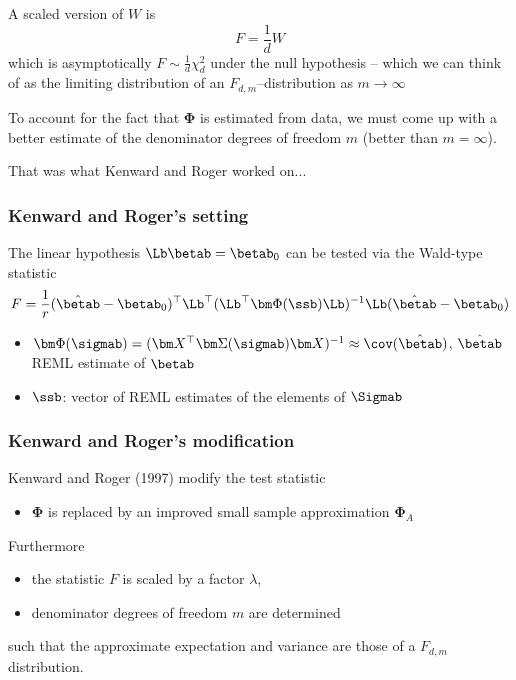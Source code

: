 \begin{sframe}
  A scaled version of $W$ is 
\begin{displaymath}
  F = \frac{1}{d} W
\end{displaymath}
which is asymptotically $F \sim \frac{1}{d} \chi^2_d$
under the null hypothesis -- which we can think of as the limiting distribution
of an $F_{d,m}$--distribution as $m\rightarrow \infty$

To account for the fact that $\bm\Phi$
is estimated from data, we must come up with a better estimate of the
denominator degrees of freedom $m$ (better than $m=\infty$).

That was what Kenward and Roger worked on... 
\end{sframe}

\begin{sframe}
  \frametitle{Kenward and Roger's setting}
The linear hypothesis $\Lb \betab = \betab_0$ 
can be tested via the  Wald-type  statistic
\begin{gather*}
F= \frac{1}{r}(\hat \betab - \betab_0)^\top \Lb^\top   (\Lb^\top \bm \Phi(\ssb) \Lb)^{-1}
 \Lb (\hat \betab - \betab_0)
\end{gather*}
\begin{itemize}
\item
$\bm \Phi (\sigmab) = (\bm X^\top \bm \Sigma(\sigmab) \bm X)^{-1} \approx
\cov(\hat \betab)$, $\hat  \betab$ REML estimate of $\betab$ 
\item
$\ssb$: vector of REML estimates of the elements of $\Sigmab$
\end{itemize}
\end{sframe}

\begin{sframe}
  \frametitle{Kenward and Roger's modification}
Kenward and Roger (1997) modify the test statistic
\begin{itemize}
\item
$\bm \Phi$ is replaced by an improved small sample approximation $\bm \Phi_A$
\end{itemize}
Furthermore
\begin{itemize}
\item   
the statistic $F$ is scaled by a factor $\lambda$,
\item
denominator degrees of freedom $m$ are determined
\end{itemize}
such that the approximate expectation and variance are those of a $F_{d,m}$ distribution.
\end{sframe}


